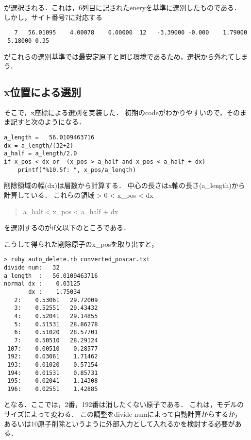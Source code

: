 \documentclass[11pt,dvipdfmx]{jsarticle}
\begin{document}
が選択される．これは，6列目に記されたeneryを基準に選別したものである．
しかし，サイト番号7に対応する

\begin{verbatim}
   7   56.01095    4.00078    0.00000  12   -3.39000 -0.000    1.79000   -5.18000 0.35
\end{verbatim}

がこれらの選別基準では最安定原子と同じ環境であるため，選択から外れてしまう．

    \subsection{x位置による選別}\label{xux4f4dux7f6eux306bux3088ux308bux9078ux5225}

そこで，x座標による選別を実装した．
初期のcodeがわかりやすいので，そのまま記すと次のようになる．

\begin{verbatim}
a_length =   56.0109463716
dx = a_length/(32+2)
a_half = a_length/2.0
if x_pos < dx or  (x_pos > a_half and x_pos < a_half + dx)
    printf("%10.5f: ", x_pos/a_length)
\end{verbatim}

削除領域の幅(dx)は層数から計算する．
中心の長さはx軸の長さ(a\_length)から計算している． これらの領域
\textgreater{} 0 \textless{} x\_pos \textless{} dx

\begin{quote}
a\_half \textless{} x\_pos \textless{} a\_half + dx
\end{quote}
を選別するのがif文以下のところである．

こうして得られた削除原子のx\_posを取り出すと，

\begin{verbatim}
> ruby auto_delete.rb converted_poscar.txt 
divide num:   32
a length  :   56.0109463716
normal dx :    0.03125
       dx :    1.75034
   2:    0.53061   29.72009
   3:    0.52551   29.43432
   4:    0.52041   29.14855
   5:    0.51531   28.86278
   6:    0.51020   28.57701
   7:    0.50510   28.29124
 107:    0.00510    0.28577
 192:    0.03061    1.71462
 193:    0.01020    0.57154
 194:    0.01531    0.85731
 195:    0.02041    1.14308
 196:    0.02551    1.42885
\end{verbatim}

となる．ここでは，2番，192番は消したくない原子である．
これは，モデルのサイズによって変わる． この調整をdivide
numによって自動計算からするか，
あるいは10原子削除というように外部入力として入れるかを検討する必要がある．
\end{document}
